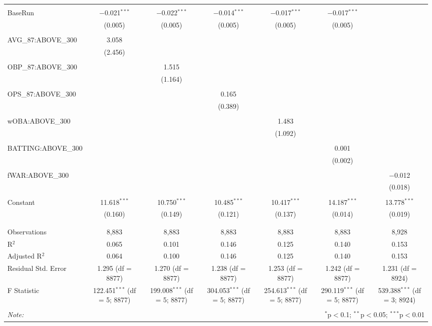 \begin{table}[!htbp]
\begin{tabular}{@{\extracolsep{5pt}}lcccccc}
  & & & & & & \\
 BaseRun & $-$0.021$^{***}$ & $-$0.022$^{***}$ & $-$0.014$^{***}$ & $-$0.017$^{***}$ & $-$0.017$^{***}$ &  \\
  & (0.005) & (0.005) & (0.005) & (0.005) & (0.005) &  \\
  & & & & & & \\
 AVG\_87:ABOVE\_300 & 3.058 &  &  &  &  &  \\
  & (2.456) &  &  &  &  &  \\
  & & & & & & \\
 OBP\_87:ABOVE\_300 &  & 1.515 &  &  &  &  \\
  &  & (1.164) &  &  &  &  \\
  & & & & & & \\
 OPS\_87:ABOVE\_300 &  &  & 0.165 &  &  &  \\
  &  &  & (0.389) &  &  &  \\
  & & & & & & \\
 wOBA:ABOVE\_300 &  &  &  & 1.483 &  &  \\
  &  &  &  & (1.092) &  &  \\
  & & & & & & \\
 BATTING:ABOVE\_300 &  &  &  &  & 0.001 &  \\
  &  &  &  &  & (0.002) &  \\
  & & & & & & \\
 fWAR:ABOVE\_300 &  &  &  &  &  & $-$0.012 \\
  &  &  &  &  &  & (0.018) \\
  & & & & & & \\
 Constant & 11.618$^{***}$ & 10.750$^{***}$ & 10.485$^{***}$ & 10.417$^{***}$ & 14.187$^{***}$ & 13.778$^{***}$ \\
  & (0.160) & (0.149) & (0.121) & (0.137) & (0.014) & (0.019) \\
  & & & & & & \\
\hline \\[-1.8ex]
Observations & 8,883 & 8,883 & 8,883 & 8,883 & 8,883 & 8,928 \\
R$^{2}$ & 0.065 & 0.101 & 0.146 & 0.125 & 0.140 & 0.153 \\
Adjusted R$^{2}$ & 0.064 & 0.100 & 0.146 & 0.125 & 0.140 & 0.153 \\
Residual Std. Error & 1.295 (df = 8877) & 1.270 (df = 8877) & 1.238 (df = 8877) & 1.253 (df = 8877) & 1.242 (df = 8877) & 1.231 (df = 8924) \\
F Statistic & 122.451$^{***}$ (df = 5; 8877) & 199.008$^{***}$ (df = 5; 8877) & 304.053$^{***}$ (df = 5; 8877) & 254.613$^{***}$ (df = 5; 8877) & 290.119$^{***}$ (df = 5; 8877) & 539.388$^{***}$ (df = 3; 8924) \\
\hline
\hline \\[-1.8ex]
\textit{Note:}  & \multicolumn{6}{r}{$^{*}$p$<$0.1; $^{**}$p$<$0.05; $^{***}$p$<$0.01} \\
\end{tabular}
\end{table}
